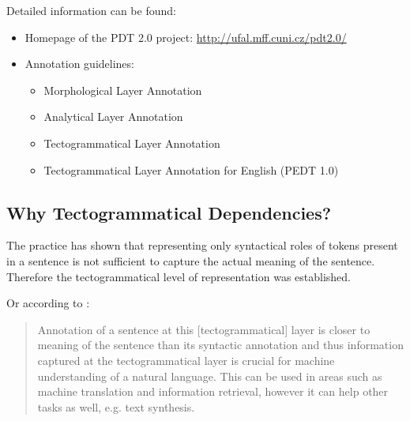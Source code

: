\medskip
Detailed information can be found:
\begin{itemize}
	\item Homepage of the PDT 2.0 project: \url{http://ufal.mff.cuni.cz/pdt2.0/}
	\item Annotation guidelines:	
	\begin{itemize}
		\item Morphological Layer Annotation \citep{mmanCz2005}
		\item Analytical Layer Annotation \citep{amanEn1999}
		\item Tectogrammatical Layer Annotation \citep{biblio:MiBeAnnotationtectogrammatical2006}
		\item Tectogrammatical Layer Annotation for English (PEDT 1.0) \citep{biblio:CiHaAnnotationEnglish2006}
		
	\end{itemize}	
\end{itemize}

\subsection{Why Tectogrammatical Dependencies?}

The practice has shown that representing only syntactical roles of tokens present in a sentence is not sufficient to capture the actual meaning of the sentence. Therefore the tectogrammatical level of representation was established.

Or according to \cite{biblio:KlTransformationBasedTectogrammatical2006}:

\begin{quote}
Annotation of a sentence at this [tectogrammatical] layer is closer to meaning of the sentence than its syntactic annotation and thus information captured at the tectogrammatical layer is crucial for machine understanding of a natural language. This can be used in areas such as machine translation and information retrieval, however it can help other tasks as well, e.g. text synthesis.	
\end{quote}



